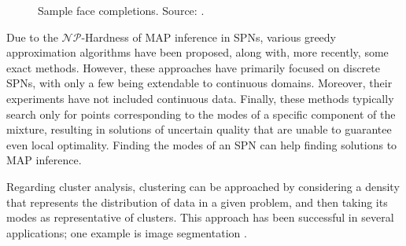 \begin{figure}
  \centering

  \caption[Sample face completions]{Sample face completions. Source: \citet{Poon2011}.}
  \label{fig:imagecompletion}
\end{figure}

Due to the $\mathcal{NP}$-Hardness of MAP inference in SPNs, various greedy approximation algorithms have been proposed, along with, more recently, some exact methods. However, these approaches have primarily focused on discrete SPNs, with only a few being extendable to continuous domains. Moreover, their experiments have not included continuous data. Finally, these methods typically search only for points corresponding to the modes of a specific component of the mixture, resulting in solutions of uncertain quality that are unable to guarantee even local optimality. Finding the modes of an SPN can help finding solutions to MAP inference.

Regarding cluster analysis, clustering can be approached by considering a density that represents the distribution of data in a given problem, and then taking its modes as representative of clusters. This approach has been successful in several applications; one example is image segmentation \citep{Cheng1995, Comaniciu2002, Li2007}.


